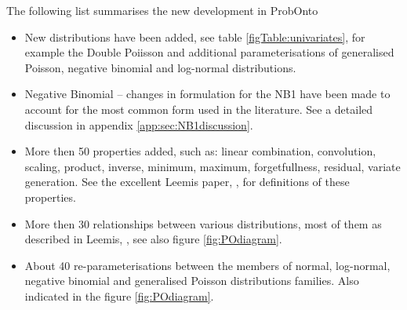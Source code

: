The following list summarises the new development in ProbOnto
\begin{itemize}
\item 
New distributions have been added, see table \ref{figTable:univariates}, 
for example the Double Poiisson and additional parameterisations of 
generalised Poisson, negative binomial and log-normal distributions.
\item 
Negative Binomial -- changes in formulation for the NB1
have been made to account for the most common form used in the literature. 
See a detailed discussion in appendix \ref{app:sec:NB1discussion}.
\item 
More then 50 properties added, such as: linear combination, convolution, 
scaling, product, inverse, minimum, maximum, forgetfullness, residual, 
variate generation. See the excellent Leemis paper, \cite{Leemis:2008tg}, 
for definitions of these properties.
\item 
More then 30 relationships between various distributions, most of them as 
described in Leemis, \cite{Leemis:2008tg}, see also figure \ref{fig:POdiagram}.
\item 
About 40 re-parameterisations between the members of normal, log-normal, 
negative binomial and generalised Poisson distributions families. Also indicated
in the figure \ref{fig:POdiagram}.
\end{itemize}

